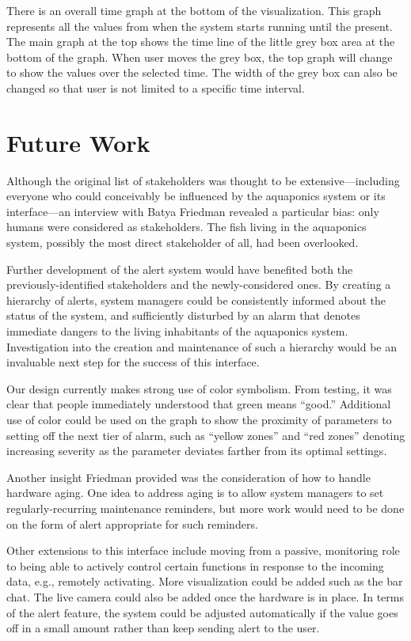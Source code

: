 \documentclass{sigchi}
\begin{document}
There is an overall time graph at the bottom of the visualization. This graph represents all the values from when the system starts running until the present. The main graph at the top shows the time line of the little grey box area at the bottom of the graph. When user moves the grey box, the top graph will change to show the values over the selected time. The width of the grey box can also be changed so that user is not limited to a specific time interval. 

\section{Future Work}
Although the original list of stakeholders was thought to be extensive---including everyone who could conceivably be influenced by the aquaponics system or its interface---an interview with Batya Friedman revealed a particular bias: only humans were considered as stakeholders. The fish living in the aquaponics system, possibly the most direct stakeholder of all, had been overlooked. 

Further development of the alert system would have benefited both the previously-identified stakeholders and the newly-considered ones. By creating a hierarchy of alerts, system managers could be consistently informed about the status of the system, and sufficiently disturbed by an alarm that denotes immediate dangers to the living inhabitants of the aquaponics system. Investigation into the creation and maintenance of such a hierarchy would be an invaluable next step for the success of this interface. 

Our design currently makes strong use of color symbolism. From testing, it was clear that people immediately understood that green means ``good.'' Additional use of color could be used on the graph to show the proximity of parameters to setting off the next tier of alarm, such as ``yellow zones'' and ``red zones'' denoting increasing severity as the parameter deviates farther from its optimal settings.

Another insight Friedman provided was the consideration of how to handle hardware aging. One idea to address aging is to allow system managers to set regularly-recurring maintenance reminders, but more work would need to be done on the form of alert appropriate for such reminders.  

Other extensions to this interface include moving from a passive, monitoring role to being able to actively control certain functions in response to the incoming data, e.g., remotely activating. More visualization could be added such as the bar chat. The live camera could also be added once the hardware is in place. In terms of the alert feature, the system could be adjusted automatically if the value goes off in a small amount rather than keep sending alert to the user.
\end{document}
